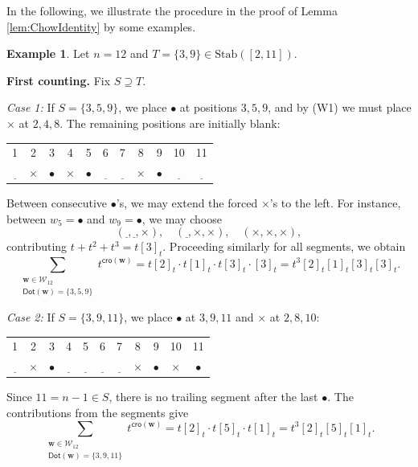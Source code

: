 \documentclass[reqno]{amsart}
\newcommand{\Stab}{{\mathrm{Stab}}}
\newcommand{\cro}{{\mathsf{cro}}}
\renewcommand{\Dot}{{\mathsf{Dot}}}
\theoremstyle{definition}
\newtheorem{exa}[thm]{Example}
\theoremstyle{remark}
\begin{document}
In the following, we illustrate the procedure in the proof of Lemma \ref{lem:ChowIdentity} by some examples.
\begin{exa}
Let $n=12$ and $T=\{3,9\}\in\Stab([2,11])$.

\medskip
\noindent
\textbf{First counting.}
Fix $S\supseteq T$.

\smallskip
\emph{Case 1:}
If $S=\{3,5,9\}$, we place $\bullet$ at positions $3,5,9$, and by (W1) we must place $\times$ at $2,4,8$. The remaining positions are initially blank:
\begin{center}
\begin{tabular}{c c c c c c c c c c c}
1 & 2 & 3 & 4 & 5 & 6 & 7 & 8 & 9 & 10 & 11\\
$\underline{\phantom{~}}$ & $\times$ & $\bullet$ & $\times$ & $\bullet$ & $\underline{\phantom{~}}$ & $\underline{\phantom{~}}$ & $\times$ & $\bullet$ & $\underline{\phantom{~}}$ & $\underline{\phantom{~}}$
\end{tabular}
\end{center}

Between consecutive $\bullet$'s, we may extend the forced $\times$'s to the left. For instance, between $w_5=\bullet$ and $w_9=\bullet$, we may choose
\[
(\underline{\phantom{~}},\underline{\phantom{~}},\times),\quad
(\underline{\phantom{~}},\times,\times),\quad
(\times,\times,\times),
\]
contributing $t+t^2+t^3=t[3]_t$. Proceeding similarly for all segments, we obtain
\[
\sum_{\substack{\mathbf{w}\in\mathcal{W}_{12}\\ \Dot(\mathbf{w})=\{3,5,9\}}}
t^{\cro(\mathbf{w})}
= t[2]_t \cdot t[1]_t \cdot t[3]_t \cdot [3]_t
= t^3[2]_t[1]_t[3]_t[3]_t.
\]

\smallskip
\emph{Case 2:}
If $S=\{3,9,11\}$, we place $\bullet$ at $3,9,11$ and $\times$ at $2,8,10$:
\begin{center}
\begin{tabular}{c c c c c c c c c c c}
1 & 2 & 3 & 4 & 5 & 6 & 7 & 8 & 9 & 10 & 11\\
$\underline{\phantom{~}}$ & $\times$ & $\bullet$ & $\underline{\phantom{~}}$ & $\underline{\phantom{~}}$ & $\underline{\phantom{~}}$ & $\underline{\phantom{~}}$ & $\times$ & $\bullet$ & $\times$ & $\bullet$
\end{tabular}
\end{center}

Since $11=n-1\in S$, there is no trailing segment after the last $\bullet$. The contributions from the segments give
\[
\sum_{\substack{\mathbf{w}\in\mathcal{W}_{12}\\ \Dot(\mathbf{w})=\{3,9,11\}}}
t^{\cro(\mathbf{w})}
= t[2]_t \cdot t[5]_t \cdot t[1]_t
= t^3[2]_t[5]_t[1]_t.
\]


\end{exa}
\end{document}

